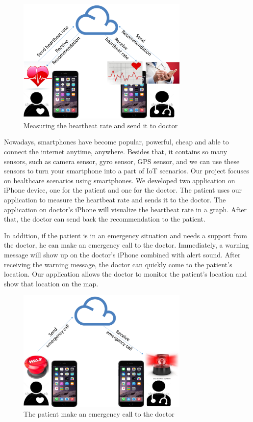 \begin{figure}[htbp]
\centering
\includegraphics[width=0.75\textwidth]{scenario1.png}
\caption{Measuring the heartbeat rate and send it to doctor}
\label{fig:scenario1}
\end{figure}

Nowadays, smartphones have become popular, powerful, cheap and able to connect the internet anytime, anywhere. Besides that, it contains so many sensors, such as camera sensor, gyro sensor, GPS sensor, and we can use these sensors to turn your smartphone into a part of IoT scenarios. Our project focuses on healthcare scenarios using smartphones. We developed two application on iPhone device, one for the patient and one for the doctor. The patient uses our application to measure the heartbeat rate and sends it to the doctor. The application on doctor's iPhone will visualize the heartbeat rate in a graph. After that, the doctor can send back the recommendation to the patient.

In addition, if the patient is in an emergency situation and needs a support from the doctor, he can make an emergency call to the doctor. Immediately, a warning message will show up on the doctor's iPhone combined with alert sound. After receiving the warning message, the doctor can quickly come to the patient's location. Our application allows the doctor to monitor the patient's location and show that location on the map.

\begin{figure}[htbp]
\centering
\includegraphics[width=0.75\textwidth]{scenario2.png}
\caption{The patient make an emergency call to the doctor}
\label{fig:scenario2}
\end{figure}


